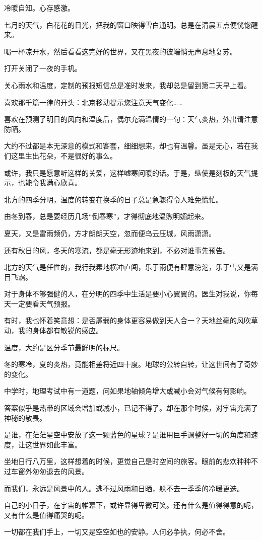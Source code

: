 \documentclass[12pt,a4paper]{article}
\def\blankrev{\vspace{1ex}}									%
\begin{document}
	\endwriting



		冷暖自知。心存感激。

		\blankrev \blankrev
		七月的天气，白花花的日光，把我的窗口映得雪白通明。总是在清晨五点便恍惚醒来。\par
		喝一杯凉开水，然后看看这完好的世界，又在黑夜的彼端悄无声息地复苏。\par
		打开关闭了一夜的手机。\par
		关心雨水和温度，定制的预报短信总是准时发来，我却总是留到第二天早上看。\par
		喜欢那千篇一律的开头：北京移动提示您注意天气变化……\par
		喜欢在预测了明日的风向和温度后，偶尔充满温情的一句：天气炎热，外出请注意防晒。\par
		大约不过都是本无深意的模式和客套，细细想来，却也有温馨。虽是无心，若在我们这里生出花朵，不是很好的事么。\par
		或许，我只是愿意听这样的关爱，这样嘘寒问暖的话。于是，纵使是刻板的天气提示，也能令我满心欣喜。

		\blankrev
		北方的四季分明，温度的转变在换季的日子总是急骤得令人难免慌忙。\par
		由冬到春，总是要经历几场“倒春寒”，才得彻底地温煦明媚起来。\par
		夏天，又是雷雨频仍，方才朗朗天空，忽而便乌云压城，风雨潇潇。\par
		还有秋日的风，冬天的寒流，都是毫无形迹地来到，不必对谁事先预告。\par
		北方的天气是任性的，我行我素地横冲直闯，乐于雨便有肆意滂沱，乐于雪又是满目飞霜。\par
		对于身体不够强健的人，在分明的四季中生活是要小心翼翼的。医生对我说，你每天一定要看天气预报。\par
		有时，我也怀着笑意想：是否孱弱的身体更容易做到天人合一？天地丝毫的风吹草动，我的身体都有敏锐的感应。

		\blankrev
		温度，大约是区分季节最鲜明的标尺。\par
		冬的寒冷，夏的炎热，竟能相差将近四十度。地球的公转自转，让这世间有了奇妙的变化。\par
		中学时，地理考试中有一道题，问如果地轴倾角增大或减小会对气候有何影响。\par
		答案似乎是热带的区域会增加或减小，已记不得了。却在那个时候，对宇宙充满了神秘的敬畏。\par
		是谁，在茫茫星空中安放了这一颗蓝色的星球？是谁用巨手调整好一切的角度和速度，让这世界如此丰富。\par
		坐地日行八万里，这样想着的时候，更觉自己是时空间的旅客。眼前的悲欢种种不过车窗外匆匆退去的风景。\par
		而我们，永远是风景中的人。逃不过风雨和日晒，躲不去一季季的冷暖更迭。\par
		自己的小日子，在宇宙的帷幕下，或许显得卑微可笑。还有什么是值得得意的呢，又有什么是值得痛哭的呢。\par
		一切都在我们手上，一切又是空空如也的安静。人何必争执，何必不舍。
\end{document}

